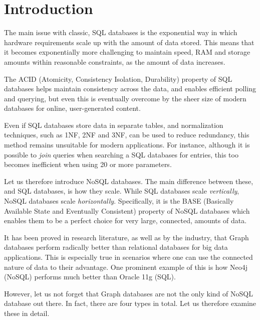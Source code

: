 \documentclass[10pt,        %
               a4paper,     %
               journal,     %
               ]{IEEEtran}
\begin{document}
\section{Introduction}
The main issue with classic, SQL databases is the exponential way in which hardware requirements scale up with the amount of data stored. This means that it becomes exponentially more challenging to maintain speed, RAM and storage amounts within reasonable constraints, as the amount of data increases. \par
The ACID (Atomicity, Consistency Isolation, Durability) property of SQL databases helps maintain consistency across the data, and enables efficient polling and querying, but even this is eventually overcome by the sheer size of modern databases for online, user-generated content. \par
Even if SQL databases store data in separate tables, and normalization techniques, such as 1NF, 2NF and 3NF, can be used to reduce redundancy, this method remains unsuitable for modern applications. For instance, although it is possible to \textit{join} queries when searching a SQL databases for entries, this too becomes inefficient when using 20 or more parameters. \par
Let us therefore introduce NoSQL databases. The main difference between these, and SQL databases, is how they scale. While SQL databases scale \textit{vertically}, NoSQL databases scale \textit{horizontally}. Specifically, it is the BASE (Basically Available State and Eventually Consistent) property of NoSQL databases which enables them to be a perfect choice for very large, connected, amounts of data. \par
It has been proved in research literature, as well as by the industry, that Graph databases perform radically better than relational databases for big data applications. This is especially true in scenarios where one can use the connected nature of data to their advantage. One prominent example of this is how Neo4j (NoSQL) performs much better than Oracle 11g (SQL). \par
However, let us not forget that Graph databases are not the only kind of NoSQL database out there. In fact, there are four types in total. Let us therefore examine these in detail.
\end{document}
